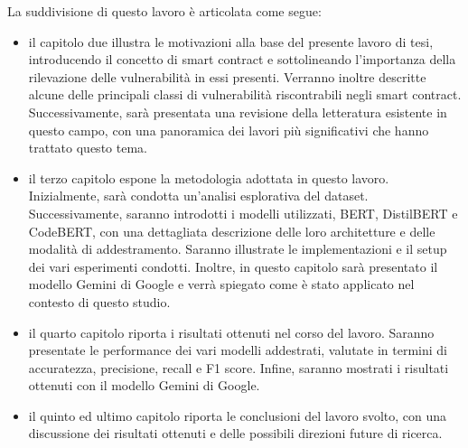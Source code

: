 \documentclass[../../Thesis.tex]{subfiles}
\begin{document}
La suddivisione di questo lavoro è articolata come segue:
\begin{itemize}
    \item il capitolo due illustra le motivazioni alla base del presente lavoro di tesi, introducendo il concetto di smart contract e sottolineando l'importanza della rilevazione delle vulnerabilità in essi presenti. Verranno inoltre descritte alcune delle principali classi di vulnerabilità riscontrabili negli smart contract. Successivamente, sarà presentata una revisione della letteratura esistente in questo campo, con una panoramica dei lavori più significativi che hanno trattato questo tema.
    \item il terzo capitolo espone la metodologia adottata in questo lavoro. Inizialmente, sarà condotta un'analisi esplorativa del dataset. Successivamente, saranno introdotti i modelli utilizzati, BERT, DistilBERT e CodeBERT, con una dettagliata descrizione delle loro architetture e delle modalità di addestramento. Saranno illustrate le implementazioni e il setup dei vari esperimenti condotti. Inoltre, in questo capitolo sarà presentato il modello Gemini di Google e verrà spiegato come è stato applicato nel contesto di questo studio.
    \item il quarto capitolo riporta i risultati ottenuti nel corso del lavoro. Saranno presentate le performance dei vari modelli addestrati, valutate in termini di accuratezza, precisione, recall e F1 score. Infine, saranno mostrati i risultati ottenuti con il modello Gemini di Google.
    \item il quinto ed ultimo capitolo riporta le conclusioni del lavoro svolto, con una discussione dei risultati ottenuti e delle possibili direzioni future di ricerca.     
\end{itemize}
\end{document}
